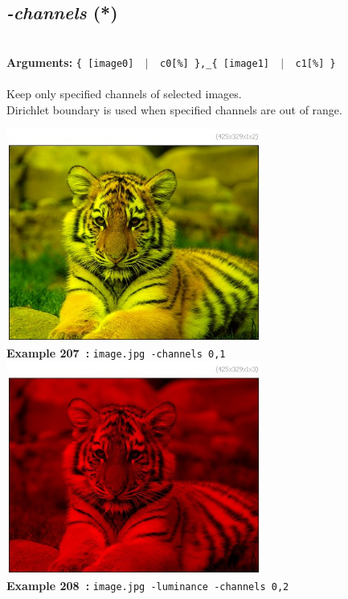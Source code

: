 \documentclass[a4paper,11pt,twoside]{book}
\begin{document}
\subsection{\emph{-channels} (*)}\vspace*{-0.5em}
~\\\textbf{Arguments: } 
{\small \texttt{\{ [image0] ~$|$~ c0[\%] \},\_\{ [image1] ~$|$~ c1[\%] \}}}\\~\\
Keep only specified channels of selected images.
~\\Dirichlet boundary is used when specified channels are out of range.
\begin{center}\includegraphics[keepaspectratio=true,height=7cm,width=\textwidth]{img/gmic_def207.jpg}\\
{\footnotesize \textbf{Example 207~:} \texttt{image.jpg -channels 0,1}}
\\\includegraphics[keepaspectratio=true,height=7cm,width=\textwidth]{img/gmic_def208.jpg}\\
{\footnotesize \textbf{Example 208~:} \texttt{image.jpg -luminance -channels 0,2}}
\end{center}
\end{document}
